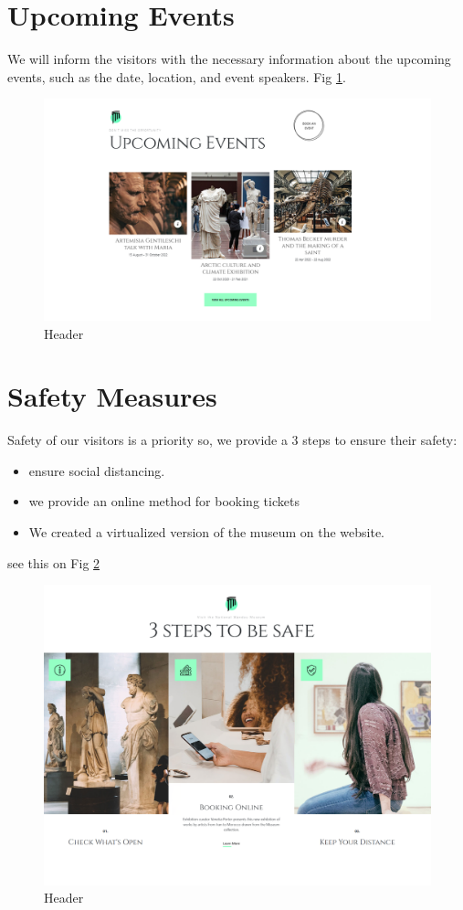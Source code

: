 \documentclass{article}
\begin{document}
\section{Upcoming Events}
We will inform the visitors with the necessary information about the upcoming events, such as the date, location, and event speakers. Fig \ref{fig:upcoming}.
\begin{figure}
	\centering
	\includegraphics[width=\linewidth]{img/upcoming.PNG}
	\caption{Header}
	\label{fig:upcoming}
\end{figure} 
\section{Safety Measures}
Safety of our visitors is a priority so, we provide a 3 steps to ensure their safety:
\begin{itemize}
\item ensure social distancing.
\item we provide an online method for booking tickets
\item We created a virtualized version of the museum on the website.
\end{itemize}
see this on Fig \ref{fig:safety}
\begin{figure}
	\centering
	\includegraphics[width=\linewidth]{img/safety.PNG}
	\caption{Header}
	\label{fig:safety}
\end{figure} 
\end{document}
